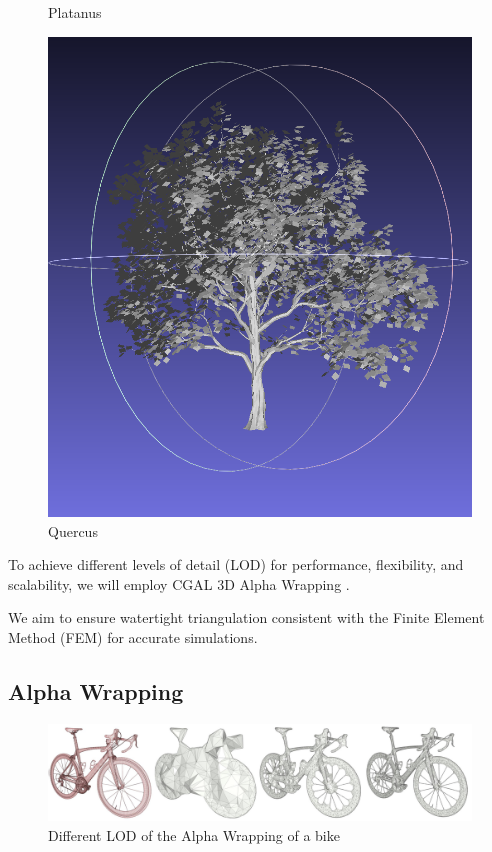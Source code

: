 \documentclass[12pt]{article}
\begin{document}
\begin{figure}[H]
\begin{minipage}{0.24\textwidth}
        \caption{Platanus}
    \end{minipage}\hfill
    \begin{minipage}{0.24\textwidth}
        \centering
        \includegraphics[width=\textwidth]{images/quercus.png}
        \caption{Quercus}
    \end{minipage}
\end{figure}

To achieve different levels of detail (LOD) for performance, flexibility,
and scalability, we will employ CGAL 3D Alpha Wrapping \cite{cgal_alpha_wrapper}.

We aim to ensure watertight triangulation consistent with the Finite Element Method
(FEM) for accurate simulations.

\newpage

\subsection{Alpha Wrapping}
\begin{figure}[H]
    \centering
        \centering
        \includegraphics[width=\textwidth]{images/aw3_bike_lod.jpg}
        \caption{Different LOD of the Alpha Wrapping of a bike}
\end{figure}
\end{document}
